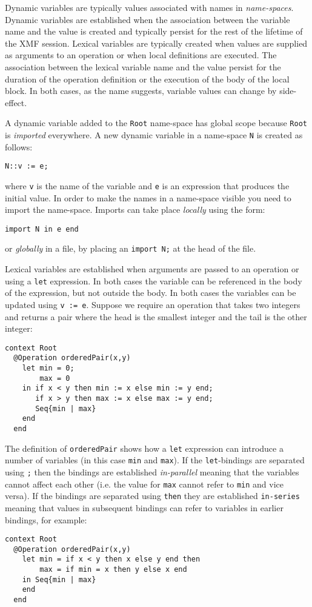 \documentclass{article}
\begin{document}
Dynamic variables are typically values
associated with names in {\em name-spaces}. Dynamic variables are established when the association between
the variable name and the value is created and typically persist for the rest of the lifetime of the XMF session.
Lexical variables are typically created when values are supplied as arguments to an operation or when local
definitions are executed. The association between the lexical variable name and the value persist for the duration 
of the operation definition or the execution of the body of the local block. In both cases, as the name suggests,
variable values can change by side-effect.

A dynamic variable added to the {\tt Root} name-space has global scope because {\tt Root} is {\em imported}
everywhere. A new dynamic variable in a name-space {\tt N} is created as follows:
\begin{verbatim}
N::v := e;
\end{verbatim}
where {\tt v} is the name of the variable and {\tt e} is an expression that produces the initial value. In
order to make the names in a name-space visible you need to import the name-space. Imports can take place
{\em locally} using the form:
\begin{verbatim}
import N in e end
\end{verbatim}
or {\em globally} in a file, by placing an {\tt import N;} at the head of the file.

Lexical variables are established when arguments are passed to an operation or using a {\tt let}
expression. In both cases the variable can be referenced in the body of the expression, but not
outside the body. In both cases the variables can be updated using {\tt v := e}. Suppose we require
an operation that takes two integers and returns a pair where the head is the smallest integer and 
the tail is the other integer:
\begin{verbatim}
context Root
  @Operation orderedPair(x,y)
    let min = 0;
        max = 0
    in if x < y then min := x else min := y end;
       if x > y then max := x else max := y end;
       Seq{min | max}
    end
  end
\end{verbatim}
The definition of {\tt orderedPair} shows how a {\tt let} expression can introduce a number of
variables (in this case {\tt min} and {\tt max}). If the {\tt let}-bindings are separated using {\tt ;}
then the bindings are established {\em in-parallel} meaning that the variables cannot affect each
other (i.e. the value for {\tt max} cannot refer to {\tt min} and vice versa). If the bindings are
separated using {\tt then} they are established {\tt in-series} meaning that values in subsequent
bindings can refer to variables in earlier bindings, for example:
\begin{verbatim}
context Root
  @Operation orderedPair(x,y)
    let min = if x < y then x else y end then
        max = if min = x then y else x end
    in Seq{min | max}
    end
  end
\end{verbatim}
\end{document}
